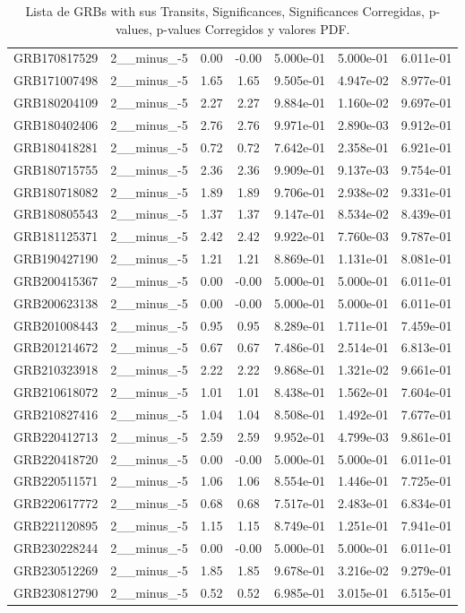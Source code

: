 \documentclass[12pt]{article}
\begin{document}
\begin{table}[h!]
{\begin{tabular}{l c c c c c c}
GRB170817529 & 2__minus_-5 & 0.00 & -0.00 & 5.000e-01 & 5.000e-01 & 6.011e-01 \\
GRB171007498 & 2__minus_-5 & 1.65 & 1.65 & 9.505e-01 & 4.947e-02 & 8.977e-01 \\
GRB180204109 & 2__minus_-5 & 2.27 & 2.27 & 9.884e-01 & 1.160e-02 & 9.697e-01 \\
GRB180402406 & 2__minus_-5 & 2.76 & 2.76 & 9.971e-01 & 2.890e-03 & 9.912e-01 \\
GRB180418281 & 2__minus_-5 & 0.72 & 0.72 & 7.642e-01 & 2.358e-01 & 6.921e-01 \\
GRB180715755 & 2__minus_-5 & 2.36 & 2.36 & 9.909e-01 & 9.137e-03 & 9.754e-01 \\
GRB180718082 & 2__minus_-5 & 1.89 & 1.89 & 9.706e-01 & 2.938e-02 & 9.331e-01 \\
GRB180805543 & 2__minus_-5 & 1.37 & 1.37 & 9.147e-01 & 8.534e-02 & 8.439e-01 \\
GRB181125371 & 2__minus_-5 & 2.42 & 2.42 & 9.922e-01 & 7.760e-03 & 9.787e-01 \\
GRB190427190 & 2__minus_-5 & 1.21 & 1.21 & 8.869e-01 & 1.131e-01 & 8.081e-01 \\
GRB200415367 & 2__minus_-5 & 0.00 & -0.00 & 5.000e-01 & 5.000e-01 & 6.011e-01 \\
GRB200623138 & 2__minus_-5 & 0.00 & -0.00 & 5.000e-01 & 5.000e-01 & 6.011e-01 \\
GRB201008443 & 2__minus_-5 & 0.95 & 0.95 & 8.289e-01 & 1.711e-01 & 7.459e-01 \\
GRB201214672 & 2__minus_-5 & 0.67 & 0.67 & 7.486e-01 & 2.514e-01 & 6.813e-01 \\
GRB210323918 & 2__minus_-5 & 2.22 & 2.22 & 9.868e-01 & 1.321e-02 & 9.661e-01 \\
GRB210618072 & 2__minus_-5 & 1.01 & 1.01 & 8.438e-01 & 1.562e-01 & 7.604e-01 \\
GRB210827416 & 2__minus_-5 & 1.04 & 1.04 & 8.508e-01 & 1.492e-01 & 7.677e-01 \\
GRB220412713 & 2__minus_-5 & 2.59 & 2.59 & 9.952e-01 & 4.799e-03 & 9.861e-01 \\
GRB220418720 & 2__minus_-5 & 0.00 & -0.00 & 5.000e-01 & 5.000e-01 & 6.011e-01 \\
GRB220511571 & 2__minus_-5 & 1.06 & 1.06 & 8.554e-01 & 1.446e-01 & 7.725e-01 \\
GRB220617772 & 2__minus_-5 & 0.68 & 0.68 & 7.517e-01 & 2.483e-01 & 6.834e-01 \\
GRB221120895 & 2__minus_-5 & 1.15 & 1.15 & 8.749e-01 & 1.251e-01 & 7.941e-01 \\
GRB230228244 & 2__minus_-5 & 0.00 & -0.00 & 5.000e-01 & 5.000e-01 & 6.011e-01 \\
GRB230512269 & 2__minus_-5 & 1.85 & 1.85 & 9.678e-01 & 3.216e-02 & 9.279e-01 \\
GRB230812790 & 2__minus_-5 & 0.52 & 0.52 & 6.985e-01 & 3.015e-01 & 6.515e-01 \\
\bottomrule
\end{tabular}%
}
\caption{Lista de GRBs with sus Transits, Significances, Significances Corregidas, p-values, p-values Corregidos y valores PDF.}
\end{table}
\end{document}
